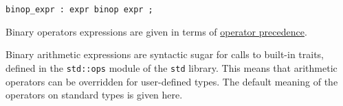 \documentclass[]{article}
\begin{document}

\begin{verbatim}
binop_expr : expr binop expr ;
\end{verbatim}

Binary operators expressions are given in terms of
\hyperref[operator-precedence]{operator precedence}.


Binary arithmetic expressions are syntactic sugar for calls to built-in
traits, defined in the \texttt{std::ops} module of the \texttt{std}
library. This means that arithmetic operators can be overridden for
user-defined types. The default meaning of the operators on standard
types is given here.
\end{document}
